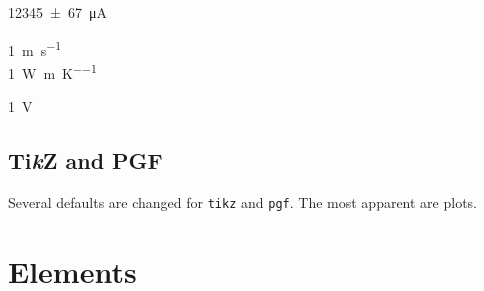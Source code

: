 \documentclass[10pt,titlepage]{article}
\newcommand*{\packagename}[1]{\texttt{#1}}
\begin{document}
\begin{example}
\qty{12345(67)}{\micro\ampere}
\end{example}

\begin{example}
\qty{1}{\metre\per\second} \\
\qty{1}{\watt\per\metre\per\kelvin}
\end{example}

\begin{example}
\qty{1}{\volt\rms}
\end{example}


\subsection{Ti\textit{k}Z and PGF}

Several defaults are changed for \packagename{tikz} and \packagename{pgf}.
The most apparent are plots.

{
\pgfplotsset{height=1.25\linewidth}
\begin{example}
\pgfplotsset{domain=0:1,samples=6}
\end{example}
}


\section{Elements}
\end{document}
